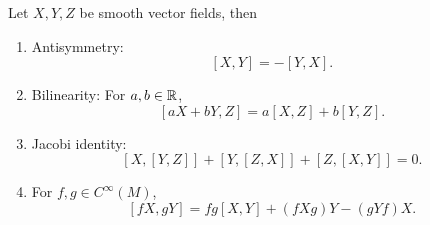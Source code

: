 \begin{proposition}
    Let $X,Y,Z$ be smooth vector fields, then
    \begin{enumerate}
        \item Antisymmetry:
        \[
            [X,Y] = -[Y,X].
        \]
        \item Bilinearity: For $a,b \in \mathbb{R}$,
        \[
                [aX + bY,Z] = a[X,Z] + b[Y,Z].
        \]
        \item Jacobi identity: 
        \[
            [X,[Y,Z]] + [Y,[Z,X]] + [Z,[X,Y]] = 0.
        \]
        \item For $f,g \in C^\infty(M)$,
        \[
            [fX,gY] = fg[X,Y] + (fXg)Y - (gYf)X.
        \]
    \end{enumerate}
\end{proposition}